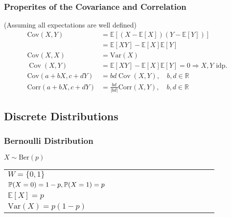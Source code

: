 \subsubsection{Properites of the Covariance and Correlation}
(Assuming all expectations are well defined)
\noindent\begin{align*}
    \mathrm{Cov}(X,Y)        & =\mathbb{E}[(X-\mathbb{E}[X])(Y-\mathbb{E}[Y])]                          \\
                             & = \mathbb{E}[XY]-\mathbb{E}[X]\mathbb{E}[Y]                              \\
    \mathrm{Cov}(X,X)        & = \mathrm{Var}(X)                                                        \\
    \operatorname{Cov}(X,Y)  & =\mathbb{E}[XY]-\mathbb{E}[X]\mathbb{E}[Y]=0 \Rightarrow X,Y\text{ idp.} \\
    \mathrm{Cov}(a+bX,c+dY)  & =bd\operatorname{Cov}(X,Y),\quad b,d\in\mathbb{R}                        \\
    \mathrm{Corr}(a+bX,c+dY) & ={\frac{bd}{|bd|}}\mathrm{Corr}(X,Y),\quad b,d\in\mathbb{R}
\end{align*}

\subsection{Discrete Distributions}

\subsubsection{Bernoulli Distribution}
$X \sim \mathrm{Ber}(p)$

\renewcommand{\arraystretch}{1.3}
\setlength{\oldtabcolsep}{\tabcolsep}\setlength\tabcolsep{3pt}

\begin{tabularx}{\linewidth}{@{}p{0.5\linewidth}p{0.49\linewidth}@{}}
    $W=\{0,1\}$                                     &
    \multirow{4}{*}{
        
    }                                                 \\
    $\mathbb{P}(X=0)=1-p,\newline\mathbb{P}(X=1)=p$ & \\
    $\mathbb{E}[X] = p$                             & \\
    $\mathrm{Var}(X) = p(1-p)$                      &
\end{tabularx}

\renewcommand{\arraystretch}{1}
\setlength\tabcolsep{\oldtabcolsep}



